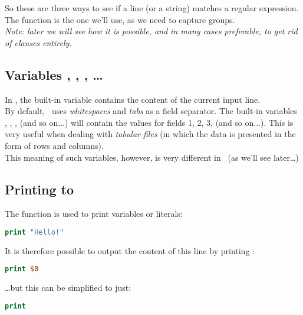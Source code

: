 \medskip


So these are three ways to see if a line (or a string) matches a regular expression. The  function is the one we'll use, as we need to capture groups. \\


\emph{Note: later we will see how it is possible, and in many cases preferable, to get rid of  clauses entirely.}




\subsection*{Variables , , , \dots}

In \awk, the built-in variable  contains the content of the current input line. \\

By default, \awk\ uses \emph{whitespaces} and \emph{tabs} as a field separator.
The built-in variables , , , (and so on...) will contain the values for fields 1, 2, 3, (and so on...). This is very useful when dealing with \emph{tabular files} (in which the data is presented in the form of rows and columns). \\

This meaning of such variables, however, is very different in \perl\ (as we'll see later\dots)


\subsection*{Printing to \stdout}

The  function is used to print variables or literals:

\begin{lstlisting}[language=awk]
print "Hello!"
\end{lstlisting}

It is therefore possible to output the content of this line by printing :

\begin{lstlisting}[language=awk]
print $0
\end{lstlisting}

\dots but this can be simplified to just:

\begin{lstlisting}[language=awk]
print
\end{lstlisting}

